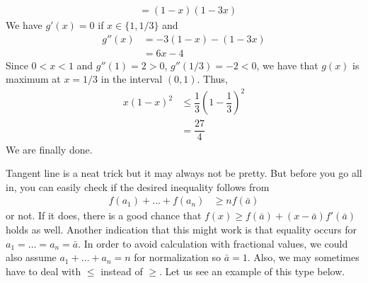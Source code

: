 \documentclass[inequalities.tex]{subfile}
\begin{document}
\begin{problem}
\begin{solution}
\begin{align*}
								& = (1-x)(1-3x)
						\end{align*}
					We have $g'(x)=0$ if $x\in\{1,1/3\}$ and
						\begin{align*}
							g''(x)
								& = -3(1-x)-(1-3x)\\
								& = 6x-4
						\end{align*}
					Since $0<x<1$ and $g''(1)=2>0$, $g''(1/3)=-2<0$, we have that $g(x)$ is maximum at $x=1/3$ in the interval $(0,1)$. Thus,
						\begin{align*}
							x(1-x)^{2}
								& \leq \dfrac{1}{3}\left(1-\dfrac{1}{3}\right)^{2}\\
								& = \dfrac{27}{4}
						\end{align*}
					We are finally done.
				\end{solution}
			
				\begin{remark}
					Tangent line is a neat trick but it may always not be pretty. But before you go all in, you can easily check if the desired inequality follows from
						\begin{align*}
							f(a_{1})+\ldots+f(a_{n})
								& \geq nf(\bar{a})
						\end{align*}
					or not. If it does, there is a good chance that $f(x)\geq f(\bar{a})+(x-\bar{a})f'(\bar{a})$ holds as well. Another indication that this might work is that equality occurs for $a_{1}=\ldots=a_{n}=\bar{a}$. In order to avoid calculation with fractional values, we could also assume $a_{1}+\ldots+a_{n}=n$ for normalization so $\bar{a}=1$. Also, we may sometimes have to deal with $\leq$ instead of $\geq$. Let us see an example of this type below.
				\end{remark}
		\end{problem}
	
\end{document}
